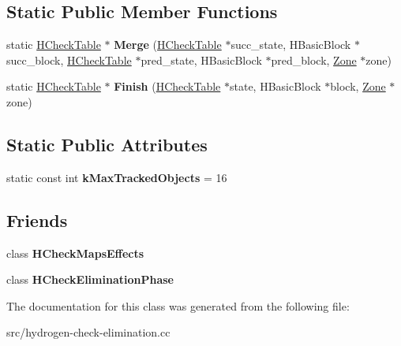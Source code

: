 \subsection*{Static Public Member Functions}
\begin{DoxyCompactItemize}
\item 
\hypertarget{classv8_1_1internal_1_1_h_check_table_ace8ecfd098c7f4032d0c6d5932ff8f2a}{}static \hyperlink{classv8_1_1internal_1_1_h_check_table}{H\+Check\+Table} $\ast$ {\bfseries Merge} (\hyperlink{classv8_1_1internal_1_1_h_check_table}{H\+Check\+Table} $\ast$succ\+\_\+state, H\+Basic\+Block $\ast$succ\+\_\+block, \hyperlink{classv8_1_1internal_1_1_h_check_table}{H\+Check\+Table} $\ast$pred\+\_\+state, H\+Basic\+Block $\ast$pred\+\_\+block, \hyperlink{classv8_1_1internal_1_1_zone}{Zone} $\ast$zone)\label{classv8_1_1internal_1_1_h_check_table_ace8ecfd098c7f4032d0c6d5932ff8f2a}

\item 
\hypertarget{classv8_1_1internal_1_1_h_check_table_a13d5ec45a07cd17e8cbf3bd65d1dd1fe}{}static \hyperlink{classv8_1_1internal_1_1_h_check_table}{H\+Check\+Table} $\ast$ {\bfseries Finish} (\hyperlink{classv8_1_1internal_1_1_h_check_table}{H\+Check\+Table} $\ast$state, H\+Basic\+Block $\ast$block, \hyperlink{classv8_1_1internal_1_1_zone}{Zone} $\ast$zone)\label{classv8_1_1internal_1_1_h_check_table_a13d5ec45a07cd17e8cbf3bd65d1dd1fe}

\end{DoxyCompactItemize}
\subsection*{Static Public Attributes}
\begin{DoxyCompactItemize}
\item 
\hypertarget{classv8_1_1internal_1_1_h_check_table_aa0284688daf9067e1f30bb0a4d58bf4f}{}static const int {\bfseries k\+Max\+Tracked\+Objects} = 16\label{classv8_1_1internal_1_1_h_check_table_aa0284688daf9067e1f30bb0a4d58bf4f}

\end{DoxyCompactItemize}
\subsection*{Friends}
\begin{DoxyCompactItemize}
\item 
\hypertarget{classv8_1_1internal_1_1_h_check_table_a017edd7762a38d25c359804dc91a414d}{}class {\bfseries H\+Check\+Maps\+Effects}\label{classv8_1_1internal_1_1_h_check_table_a017edd7762a38d25c359804dc91a414d}

\item 
\hypertarget{classv8_1_1internal_1_1_h_check_table_ae9ebe4112a895f7615fe04f5d1cd0679}{}class {\bfseries H\+Check\+Elimination\+Phase}\label{classv8_1_1internal_1_1_h_check_table_ae9ebe4112a895f7615fe04f5d1cd0679}

\end{DoxyCompactItemize}


The documentation for this class was generated from the following file\+:\begin{DoxyCompactItemize}
\item 
src/hydrogen-\/check-\/elimination.\+cc\end{DoxyCompactItemize}
